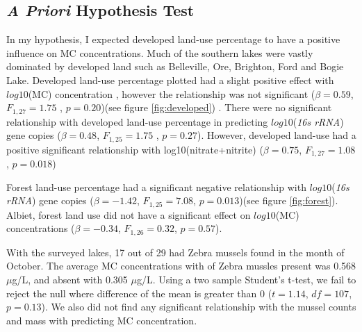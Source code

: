 \clearpage





\subsection{\emph{A Priori} Hypothesis Test}

In my hypothesis, I expected developed land-use percentage to have a positive influence on MC concentrations. Much of the southern lakes were vastly dominated by developed land such as Belleville, Ore, Brighton, Ford and Bogie Lake. 
Developed land-use percentage plotted had a slight positive effect with $log10$(MC) concentration , however the relationship was not significant  ($\beta=0.59$, $F_{{1,27}}=1.75$ , $p=0.20$)(see figure \ref{fig:developed}) . There were no significant relationship with developed land-use percentage in predicting $log10$(\emph{16s rRNA}) gene copies ($\beta=0.48$, $F_{{1,25}}=1.75$ , $p=0.27$). However, developed land-use had a positive significant relationship with log10(nitrate+nitrite) ($\beta=0.75$, $F_{{1,27}}=1.08$, $p=0.018$)

Forest land-use percentage had a significant negative relationship with $log10$(\emph{16s rRNA}) gene copies ($\beta=-1.42$, $F_{{1,25}}=7.08$, $p=0.013$)(see figure \ref{fig:forest}). Albiet, forest land use did not have a significant effect on $log10$(MC) concentrations ($\beta=-0.34$, $F_{{1,26}}=0.32$, $p=0.57$).

With the surveyed lakes, 17 out of 29 had Zebra mussels found in the month of October. The average MC concentrations with  of Zebra mussles present was 0.568 $\mu$g/L, and absent with 0.305 $\mu$g/L. Using a two sample Student's t-test, we fail to reject the null where difference of the mean is greater than 0 ($t=1.14$, $df=107$, $p=0.13$). We also did not find any significant relationship with the mussel counts and mass with predicting MC concentration.

